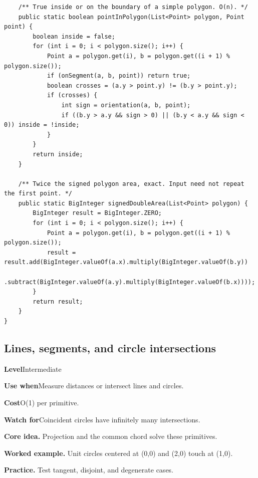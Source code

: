 \documentclass[10pt,letterpaper]{article}
\newcommand{\entrylabel}[1]{\textcolor{accent}{\bfseries #1}}
\begin{document}
\begin{lstlisting}
    /** True inside or on the boundary of a simple polygon. O(n). */
    public static boolean pointInPolygon(List<Point> polygon, Point point) {
        boolean inside = false;
        for (int i = 0; i < polygon.size(); i++) {
            Point a = polygon.get(i), b = polygon.get((i + 1) % polygon.size());
            if (onSegment(a, b, point)) return true;
            boolean crosses = (a.y > point.y) != (b.y > point.y);
            if (crosses) {
                int sign = orientation(a, b, point);
                if ((b.y > a.y && sign > 0) || (b.y < a.y && sign < 0)) inside = !inside;
            }
        }
        return inside;
    }

    /** Twice the signed polygon area, exact. Input need not repeat the first point. */
    public static BigInteger signedDoubleArea(List<Point> polygon) {
        BigInteger result = BigInteger.ZERO;
        for (int i = 0; i < polygon.size(); i++) {
            Point a = polygon.get(i), b = polygon.get((i + 1) % polygon.size());
            result = result.add(BigInteger.valueOf(a.x).multiply(BigInteger.valueOf(b.y))
                .subtract(BigInteger.valueOf(a.y).multiply(BigInteger.valueOf(b.x))));
        }
        return result;
    }
}
\end{lstlisting}
\subsection{Lines, segments, and circle intersections}
\begin{guidebox}\small
\entrylabel{Level}\quad Intermediate\par
\entrylabel{Use when}\quad Measure distances or intersect lines and circles.\par
\entrylabel{Cost}\quad O(1) per primitive.\par
\entrylabel{Watch for}\quad Coincident circles have infinitely many intersections.\par
\end{guidebox}
\noindent\textbf{Core idea.} Projection and the common chord solve these primitives.\par
\noindent\textbf{Worked example.} Unit circles centered at (0,0) and (2,0) touch at (1,0).\par
\noindent\textbf{Practice.} Test tangent, disjoint, and degenerate cases.\par
\end{document}
